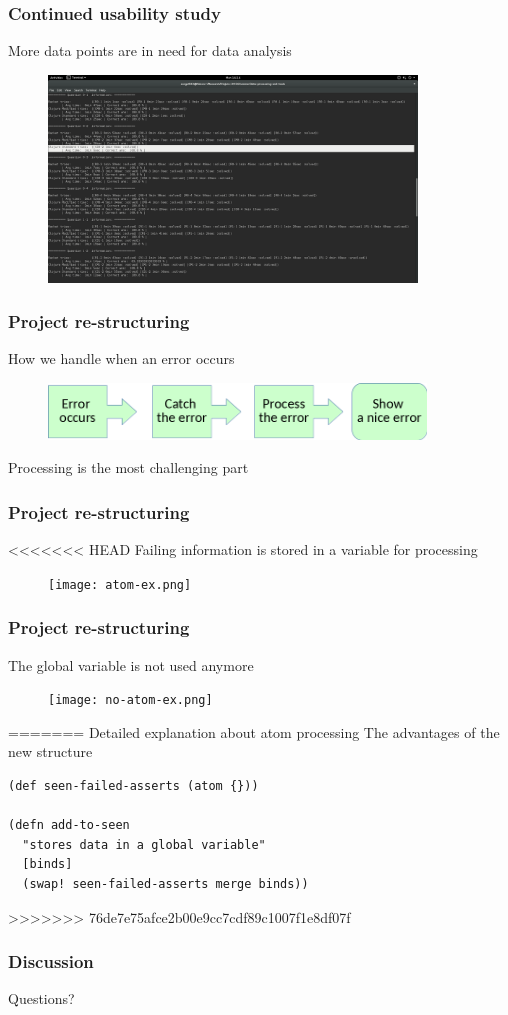 \documentclass{beamer}
\begin{document}
\begin{frame}
  \frametitle{Continued usability study }
More data points are in need for data analysis
\begin{figure}
\includegraphics[height=55mm]{one-cut.png}
\end{figure}
\end{frame}


\begin{frame}
  \frametitle{Project re-structuring}
How we handle when an error occurs 
\begin{figure}
\includegraphics[height=15mm]{Step.png}
\end{figure}
\alert{Processing} is the most challenging part
\end{frame}


\begin{frame}
  \frametitle{Project re-structuring}
<<<<<<< HEAD
Failing information is stored in a variable for processing
\begin{figure}
\texttt{[image: atom-ex.png]}
\end{figure}
\end{frame}

\begin{frame}
  \frametitle{Project re-structuring}
The global variable is not used anymore
\begin{figure}
\texttt{[image: no-atom-ex.png]}
\end{figure}
=======
Detailed explanation about atom processing
The advantages of the new structure
\begin{verbatim}
(def seen-failed-asserts (atom {}))

(defn add-to-seen
  "stores data in a global variable"
  [binds]
  (swap! seen-failed-asserts merge binds))
\end{verbatim}
>>>>>>> 76de7e75afce2b00e9cc7cdf89c1007f1e8df07f
\end{frame}

\begin{frame}
  \frametitle{Discussion}
Questions?
\end{frame}
\end{document}
